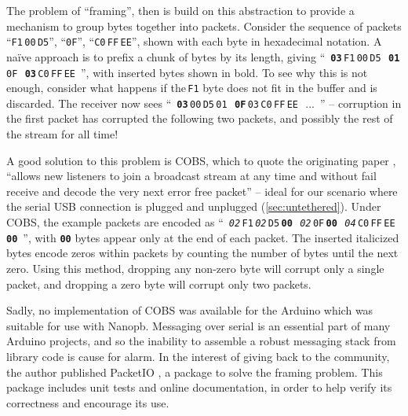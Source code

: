 \documentclass[main.tex]{subfiles}
\begin{document}
		The problem of \enquote{framing}, then is build on this abstraction to provide a mechanism to group bytes together into packets. Consider the sequence of packets
		\enquote{\texttt{F1}\,\texttt{00}\,\texttt{D5}},
		\enquote{\texttt{0F}},
		\enquote{\texttt{C0}\,\texttt{FF}\,\texttt{EE}}, shown with each byte in hexadecimal notation.
		A na\"ive approach is to prefix a chunk of bytes by its length, giving
		\mbox{\enquote{%
			\textbf{\texttt{03}}\,\texttt{F1}\,\texttt{00}\,\texttt{D5}\,%
			\textbf{\texttt{01}}\,\texttt{0F}\,%
			\textbf{\texttt{03}}\,\texttt{C0}\,\texttt{FF}\,\texttt{EE}%
		}}, with inserted bytes shown in bold.
		To see why this is not enough, consider what happens if the\,\texttt{F1} byte does not fit in the buffer and is discarded. The receiver now sees \mbox{\enquote{%
			\textbf{\texttt{03}}\,\texttt{00}\,\texttt{D5}\,\texttt{01}\,%
			\textbf{\texttt{0F}}\,\texttt{03}\,\texttt{C0}\,\texttt{FF}\,\texttt{EE}\,%
			...%
		}} -- corruption in the first packet has corrupted the following two packets, and possibly the rest of the stream for all time!

		A good solution to this problem is COBS, which to quote the originating paper \cite{cobs}, \enquote{allows new listeners to join a broadcast stream at any time and without fail receive and decode the very next error free packet} -- ideal for our scenario where the serial USB connection is plugged and unplugged (\cref{sec:untethered}). Under COBS, the example packets are encoded as
		\mbox{\enquote{%
			\textit{\texttt{02}}\,\texttt{F1}\,\textit{\texttt{02}}\,\texttt{D5}\,\textbf{\texttt{00}}\,%
			\textit{\texttt{02}}\,\texttt{0F}\,\textbf{\texttt{00}}\,%
			\textit{\texttt{04}}\,\texttt{C0}\,\texttt{FF}\,\texttt{EE}\,\textbf{\texttt{00}}%
		}}, with \textbf{\texttt{00}} bytes appear only at the end of each packet.
		The inserted italicized bytes encode zeros within packets by counting the number of bytes until the next zero.
		Using this method, dropping any non-zero byte will corrupt only a single packet, and dropping a zero byte will corrupt only two packets.

		Sadly, no implementation of COBS was available for the Arduino which was suitable for use with Nanopb\footnotemark.
		Messaging over serial is an essential part of many Arduino projects, and so the inability to assemble a robust messaging stack from library code is cause for alarm.
		In the interest of giving back to the community, the author published PacketIO \cite{packetio}, a package to solve the framing problem.
		This package includes unit tests and online documentation, in order to help verify its correctness and encourage its use.
\end{document}
